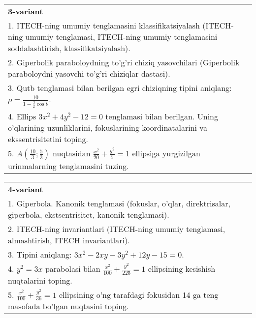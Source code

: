\documentclass{article}
\begin{document}
\begin{tabular}{m{17cm}}
\textbf{3-variant}\\
1. ITECH-ning umumiy tenglamasini klassifikatsiyalash (ITECH-ning umumiy tenglamasi, ITECH-ning umumiy tenglamasini soddalashtirish, klassifikatsiyalash).\\

2. Giperbolik paraboloydning to'g'ri chiziq yasovchilari (Giperbolik paraboloydni yasovchi to'g'ri chiziqlar dastasi).\\

3. Qutb tenglamasi bilan berilgan egri chiziqning tipini aniqlang: $\rho=\frac{10}{1-\frac{3}{2}\cos\theta}$.\\

4. Ellips $3x^{2} + 4y^{2} - 12 = 0$ tenglamasi bilan berilgan. Uning o'qlarining uzunliklarini, fokuslarining koordinatalarini va ekssentrisitetini toping.  \\

5. $A(\frac{10}{3};\frac{5}{3})$ nuqtasidan $\frac{x^{2}}{20} + \frac{y^{2}}{5} = 1$ ellipsiga yurgizilgan urinmalarning tenglamasini tuzing.  
\end{tabular}
\vspace{1cm}


\begin{tabular}{m{17cm}}
\textbf{4-variant}\\
1. Giperbola. Kanonik tenglamasi (fokuslar, o'qlar, direktrisalar, giperbola, ekstsentrisitet, kanonik tenglamasi).\\

2. ITECH-ning invariantlari (ITECH-ning umumiy tenglamasi, almashtirish, ITECH invariantlari).\\

3. Tipini aniqlang: $3x^{2}-2xy-3y^{2}+12y-15=0$.\\

4. $y^{2} = 3x$ parabolasi bilan $\frac{x^{2}}{100} + \frac{y^{2}}{225} = 1$ ellipsining kesishish nuqtalarini toping.  \\

5. $\frac{x^{2}}{100} + \frac{y^{2}}{36} = 1$ ellipsining o'ng tarafdagi fokusidan 14 ga teng masofada bo'lgan nuqtasini toping.  
\end{tabular}
\vspace{1cm}
\end{document}
